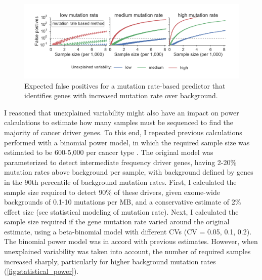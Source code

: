 \begin{figure}
  \centering
  \makeatletter
  \let\@currsize\normalsize
  \includegraphics[width=0.9\linewidth]{figures/chapter2/expected_false_positives_mutation_rate.pdf}
  \caption[Expected false positives for driver gene detection]{Expected false positives for a mutation rate-based predictor that identifies genes with increased mutation rate over background.}
  \label{fig:expected_fp}
\end{figure}

I reasoned that unexplained variability might also have an impact on power calculations to estimate how many samples must be sequenced to find the majority of cancer driver genes. To this end, I repeated previous calculations performed with a binomial power model, in which the required sample size was estimated to be 600-5,000 per cancer type \cite{RN14}. The original model was parameterized to detect intermediate frequency driver genes, having 2-20\% mutation rates above background per sample, with background defined by genes in the 90th percentile of background mutation rates. First, I calculated the sample size required to detect 90\% of these drivers, given exome-wide backgrounds of 0.1-10 mutations per MB, and a conservative estimate of 2\% effect size (see statistical modeling of mutation rate). Next, I calculated the sample size required if the gene mutation rate varied around the original estimate, using a beta-binomial model with different CVs (CV = 0.05, 0.1, 0.2). The binomial power model was in accord with previous estimates. However, when unexplained variability was taken into account, the number of required samples increased sharply, particularly for higher background mutation rates (\autoref{fig:statistical_power}).

